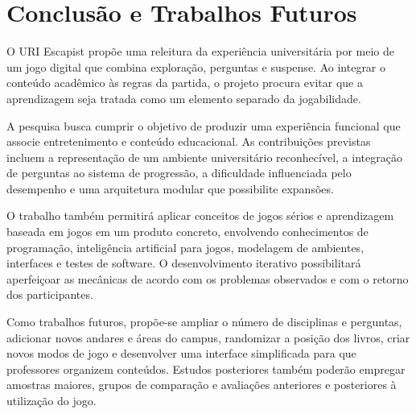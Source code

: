 \documentclass[12pt]{article}
\begin{document}
\section{Conclusão e Trabalhos Futuros}

O URI Escapist propõe uma releitura da experiência universitária por meio de um jogo digital que combina exploração, perguntas e suspense. Ao integrar o conteúdo acadêmico às regras da partida, o projeto procura evitar que a aprendizagem seja tratada como um elemento separado da jogabilidade.

A pesquisa busca cumprir o objetivo de produzir uma experiência funcional que associe entretenimento e conteúdo educacional. As contribuições previstas incluem a representação de um ambiente universitário reconhecível, a integração de perguntas ao sistema de progressão, a dificuldade influenciada pelo desempenho e uma arquitetura modular que possibilite expansões.

O trabalho também permitirá aplicar conceitos de jogos sérios e aprendizagem baseada em jogos em um produto concreto, envolvendo conhecimentos de programação, inteligência artificial para jogos, modelagem de ambientes, interfaces e testes de software. O desenvolvimento iterativo possibilitará aperfeiçoar as mecânicas de acordo com os problemas observados e com o retorno dos participantes.

Como trabalhos futuros, propõe-se ampliar o número de disciplinas e perguntas, adicionar novos andares e áreas do campus, randomizar a posição dos livros, criar novos modos de jogo e desenvolver uma interface simplificada para que professores organizem conteúdos. Estudos posteriores também poderão empregar amostras maiores, grupos de comparação e avaliações anteriores e posteriores à utilização do jogo.



\end{document}
